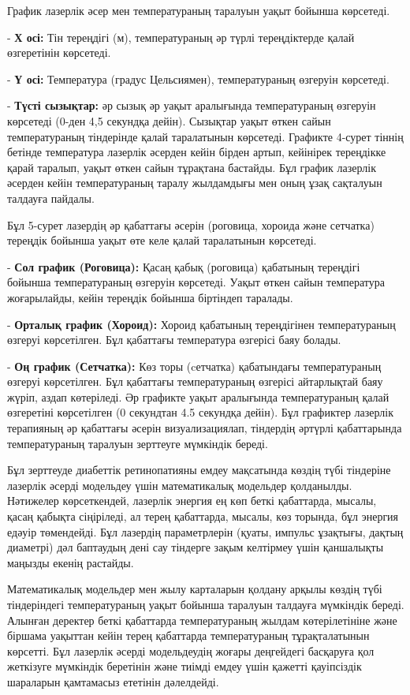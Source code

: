 \begin{multicols}{2}
График лазерлік әсер мен температураның таралуын уақыт бойынша
көрсетеді.

- {\bfseries Х осі:} Тін тереңдігі (м), температураның әр түрлі
тереңдіктерде қалай өзгеретінін көрсетеді.

- {\bfseries Ү осі:} Температура (градус Цельсиямен), температураның
өзгеруін көрсетеді.

- {\bfseries Түсті сызықтар:} әр сызық әр уақыт аралығында температураның
өзгеруін көрсетеді (0-ден 4,5 секундқа дейін). Сызықтар уақыт өткен
сайын температураның тіндерінде қалай таралатынын көрсетеді.
Графикте 4-сурет тіннің бетінде температура лазерлік әсерден кейін
бірден артып, кейінірек тереңдікке қарай таралып, уақыт өткен сайын
тұрақтана бастайды. Бұл график лазерлік әсерден кейін температураның
таралу жылдамдығы мен оның ұзақ сақталуын талдауға пайдалы.

Бұл 5-сурет лазердің әр қабаттағы әсерін (роговица, хороида және
сетчатка) тереңдік бойынша уақыт өте келе қалай таралатынын көрсетеді.

- {\bfseries Сол график (Роговица):} Қасаң қабық (роговица) қабатының
тереңдігі бойынша температураның өзгеруін көрсетеді. Уақыт өткен сайын
температура жоғарылайды, кейін тереңдік бойынша біртіндеп таралады.

- {\bfseries Орталық график (Хороид):} Хороид қабатының тереңдігінен
температураның өзгеруі көрсетілген. Бұл қабаттағы температура өзгерісі
баяу болады.

- {\bfseries Оң график (Сетчатка):} Көз торы (cетчатка) қабатындағы
температураның өзгеруі көрсетілген. Бұл қабаттағы температураның
өзгерісі айтарлықтай баяу жүріп, аздап көтеріледі.
Әр графикте уақыт аралығында температураның қалай өзгеретіні көрсетілген
(0 секундтан 4.5 секундқа дейін). Бұл графиктер лазерлік терапияның әр
қабаттағы әсерін визуализациялап, тіндердің әртүрлі қабаттарында
температураның таралуын зерттеуге мүмкіндік береді.

Бұл зерттеуде диабеттік ретинопатияны емдеу мақсатында көздің түбі
тіндеріне лазерлік әсерді модельдеу үшін математикалық модельдер
қолданылды. Нәтижелер көрсеткендей, лазерлік энергия ең көп беткі
қабаттарда, мысалы, қасаң қабықта сіңіріледі, ал терең қабаттарда,
мысалы, көз торында, бұл энергия едәуір төмендейді. Бұл лазердің
параметрлерін (қуаты, импульс ұзақтығы, дақтың диаметрі) дәл баптаудың
дені сау тіндерге зақым келтірмеу үшін қаншалықты маңызды екенің
растайды.

Математикалық модельдер мен жылу карталарын қолдану арқылы көздің түбі
тіндеріндегі температураның уақыт бойынша таралуын талдауға мүмкіндік
береді. Алынған деректер беткі қабаттарда температураның жылдам
көтерілетініне және біршама уақыттан кейін терең қабаттарда
температураның тұрақталатынын көрсетті. Бұл лазерлік әсерді модельдеудің
жоғары деңгейдегі басқаруға қол жеткізуге мүмкіндік беретінін және
тиімді емдеу үшін қажетті қауіпсіздік шараларын қамтамасыз ететінін
дәлелдейді.
\end{multicols}

